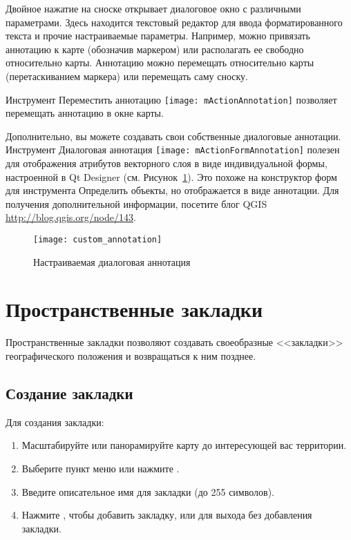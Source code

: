 Двойное нажатие на сноске открывает диалоговое окно с различными параметрами.
Здесь находится текстовый редактор для ввода форматированного текста и прочие
настраиваемые параметры. Например, можно привязать аннотацию к карте
(обозначив маркером) или располагать ее свободно относительно карты. Аннотацию
можно перемещать относительно карты (перетаскиванием маркера) или перемещать
саму сноску.

Инструмент Переместить аннотацию
\texttt{[image: mActionAnnotation]} позволяет
перемещать аннотацию в окне карты.


Дополнительно, вы можете создавать свои собственные диалоговые аннотации.
Инструмент Диалоговая аннотация
\texttt{[image: mActionFormAnnotation]} полезен
для отображения атрибутов векторного слоя в виде индивидуальной формы,
настроенной в Qt Designer (см. Рисунок~\ref{fig:custom-annotations}).
Это похоже на конструктор форм для инструмента Определить объекты, но
отображается в виде аннотации. Для получения дополнительной информации,
посетите блог QGIS \url{http://blog.qgis.org/node/143}.

\begin{figure}[ht]
   \centering
   \texttt{[image: custom\_annotation]}
   \caption{Настраиваемая диалоговая аннотация \wincaption}
   \label{fig:custom-annotations}
\end{figure}

\newpage

\section{Пространственные закладки}\label{sec:bookmarks}

Пространственные закладки позволяют создавать своеобразные <<закладки>>
географического положения и возвращаться к ним позднее.

\subsection{Создание закладки}
Для создания закладки:
\begin{enumerate}
\item Масштабируйте или панорамируйте карту до интересующей вас территории.
\item Выберите пункт меню  \arrow
{} или нажмите .
\item Введите описательное имя для закладки (до 255 символов).
\item Нажмите , чтобы добавить закладку, или 
для выхода без добавления закладки.
\end{enumerate}

